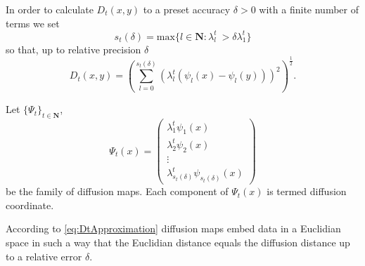 In order to calculate $D_t(x,y)$ to a preset accuracy $\delta>0$ with a finite number of terms we set
$$s_t(\delta)= \text{max}\{l\in\mathbf{N} : \lambda_l^t \>> \delta\lambda_1^t\}$$
so that, up to relative precision $\delta$
\begin{equation}\label{eq:DtApproximation}
D_t(x,y)=\left(\sum_{l=0}^{s_t(\delta)} \left(\lambda_l^t(\psi_l(x) - \psi_l(y))\right)^2 \right)^{\frac{1}{2}}.
\end{equation}

\begin{definition}
Let $\{\Psi_t\}_{t\in\mathbf{N}}$,
$$\Psi_t(x)=\begin{pmatrix}
  \lambda_1^{t}\psi_1(x) \\
  \lambda_2^{t}\psi_2(x) \\
  \vdots \\
  \lambda_{s_t(\delta)}^{t}\psi_{s_t(\delta)}(x)
 \end{pmatrix}$$ be the family of diffusion maps. Each component of $\Psi_t(x)$ is termed diffusion coordinate.
\end{definition}

According to \eqref{eq:DtApproximation} diffusion maps embed data in a Euclidian space in such a way that the Euclidian distance equals the diffusion distance up to a relative error $\delta$.

